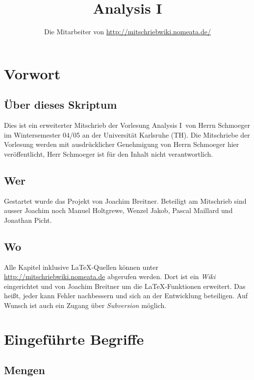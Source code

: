 \documentclass[a4paper,twoside,DIV15,BCOR12mm]{scrbook}
\author{Die Mitarbeiter von \url{http://mitschriebwiki.nomeata.de/}}
\title{Analysis I}
\begin{document}
\maketitle

\renewcommand{\thechapter}{\Roman{chapter}}
\tableofcontents

\chapter{Vorwort}

\section{Über dieses Skriptum}
Dies ist ein erweiterter Mitschrieb der Vorlesung \glqq Analysis I\grqq\ von Herrn Schmoeger im
Wintersemester 04/05 an der Universität Karlsruhe (TH). Die Mitschriebe der Vorlesung werden mit
ausdrücklicher Genehmigung von Herrn Schmoeger hier veröffentlicht, Herr Schmoeger ist für den
Inhalt nicht verantwortlich.

\section{Wer}
Gestartet wurde das Projekt von Joachim Breitner. Beteiligt am Mitschrieb sind ausser Joachim
noch Manuel Holtgrewe, Wenzel Jakob, Pascal Maillard und Jonathan Picht.

\section{Wo}
Alle Kapitel inklusive \LaTeX-Quellen können unter \url{http://mitschriebwiki.nomeata.de} abgerufen werden.
Dort ist ein \emph{Wiki} eingerichtet und von Joachim Breitner um die \LaTeX-Funktionen erweitert.
Das heißt, jeder kann Fehler nachbessern und sich an der Entwicklung
beteiligen. Auf Wunsch ist auch ein Zugang über \emph{Subversion} möglich.

\chapter{Eingeführte Begriffe}

\section{Mengen}
\end{document}
